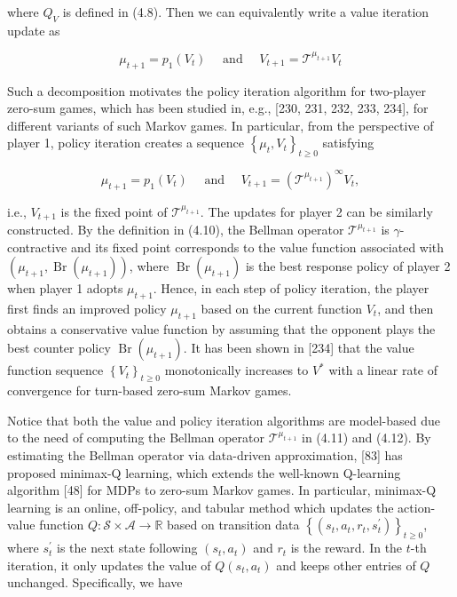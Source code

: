 \documentclass[10pt]{article}
\begin{document}
where $Q_{V}$ is defined in (4.8). Then we can equivalently write a value iteration update as

\[
\mu_{t+1}=p_{1}\left(V_{t}\right) \quad \text { and } \quad V_{t+1}=\mathcal{T}^{\mu_{t+1}} V_{t}
\]

Such a decomposition motivates the policy iteration algorithm for two-player zero-sum games, which has been studied in, e.g., [230, 231, 232, 233, 234], for different variants of such Markov games. In particular, from the perspective of player 1, policy iteration creates a sequence $\left\{\mu_{t}, V_{t}\right\}_{t \geq 0}$ satisfying

\[
\mu_{t+1}=p_{1}\left(V_{t}\right) \quad \text { and } \quad V_{t+1}=\left(\mathcal{T}^{\mu_{t+1}}\right)^{\infty} V_{t},
\]

i.e., $V_{t+1}$ is the fixed point of $\mathcal{T}^{\mu_{t+1}}$. The updates for player 2 can be similarly constructed. By the definition in (4.10), the Bellman operator $\mathcal{T}^{\mu_{t+1}}$ is $\gamma$-contractive and its fixed point corresponds to the value function associated with $\left(\mu_{t+1}, \operatorname{Br}\left(\mu_{t+1}\right)\right)$, where $\operatorname{Br}\left(\mu_{t+1}\right)$ is the best response policy of player 2 when player 1 adopts $\mu_{t+1}$. Hence, in each step of policy iteration, the player first finds an improved policy $\mu_{t+1}$ based on the current function $V_{t}$, and then obtains a conservative value function by assuming that the opponent plays the best counter policy $\operatorname{Br}\left(\mu_{t+1}\right)$. It has been shown in [234] that the value function sequence $\left\{V_{t}\right\}_{t \geq 0}$ monotonically increases to $V^{*}$ with a linear rate of convergence for turn-based zero-sum Markov games.

Notice that both the value and policy iteration algorithms are model-based due to the need of computing the Bellman operator $\mathcal{T}^{\mu_{t+1}}$ in (4.11) and (4.12). By estimating the Bellman operator via data-driven approximation, [83] has proposed minimax-Q learning, which extends the well-known Q-learning algorithm [48] for MDPs to zero-sum Markov games. In particular, minimax-Q learning is an online, off-policy, and tabular method which updates the action-value function $Q: \mathcal{S} \times \mathcal{A} \rightarrow \mathbb{R}$ based on transition data $\left\{\left(s_{t}, a_{t}, r_{t}, s_{t}^{\prime}\right)\right\}_{t \geq 0}$, where $s_{t}^{\prime}$ is the next state following $\left(s_{t}, a_{t}\right)$ and $r_{t}$ is the reward. In the $t$-th iteration, it only updates the value of $Q\left(s_{t}, a_{t}\right)$ and keeps other entries of $Q$ unchanged. Specifically, we have
\end{document}
